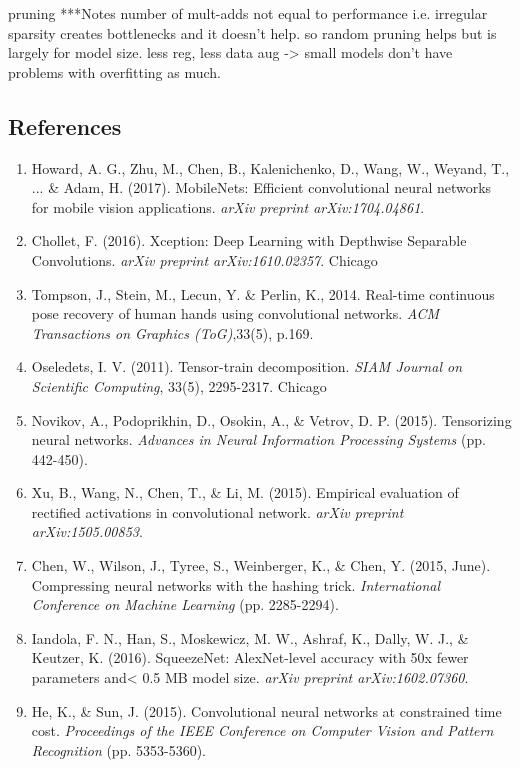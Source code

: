 \documentclass{article}
\begin{document}
 pruning
***Notes
number of mult-adds not equal to performance i.e. irregular sparsity creates bottlenecks and it doesn't help. so random pruning helps but is largely for model size. less reg, less data aug -> small models don't have problems with overfitting as much.



\subsection*{References}
\begin{enumerate}
\item Howard, A. G., Zhu, M., Chen, B., Kalenichenko, D., Wang, W., Weyand, T., ... \& Adam, H. (2017). MobileNets: Efficient convolutional neural networks for mobile vision applications. \emph{arXiv preprint arXiv:1704.04861}.
\item Chollet, F. (2016). Xception: Deep Learning with Depthwise Separable Convolutions. \emph{arXiv preprint arXiv:1610.02357}.
Chicago	
\item Tompson, J., Stein, M., Lecun, Y. \& Perlin, K., 2014. Real-time continuous pose recovery of human hands using convolutional networks. \emph{ACM Transactions on Graphics (ToG)},33(5), p.169.
\item Oseledets, I. V. (2011). Tensor-train decomposition. \emph{SIAM Journal on Scientific Computing}, 33(5), 2295-2317.
Chicago	
\item Novikov, A., Podoprikhin, D., Osokin, A., \& Vetrov, D. P. (2015). Tensorizing neural networks. \emph{Advances in Neural Information Processing Systems} (pp. 442-450).
\item Xu, B., Wang, N., Chen, T., \& Li, M. (2015). Empirical evaluation of rectified activations in convolutional network. \emph{arXiv preprint arXiv:1505.00853}.
\item Chen, W., Wilson, J., Tyree, S., Weinberger, K., \& Chen, Y. (2015, June). Compressing neural networks with the hashing trick. \emph{International Conference on Machine Learning} (pp. 2285-2294).
\item Iandola, F. N., Han, S., Moskewicz, M. W., Ashraf, K., Dally, W. J., \& Keutzer, K. (2016). SqueezeNet: AlexNet-level accuracy with 50x fewer parameters and< 0.5 MB model size. \emph{arXiv preprint arXiv:1602.07360}.
\item He, K., \& Sun, J. (2015). Convolutional neural networks at constrained time cost. \emph{Proceedings of the IEEE Conference on Computer Vision and Pattern Recognition} (pp. 5353-5360).

\end{enumerate}
\end{document}
